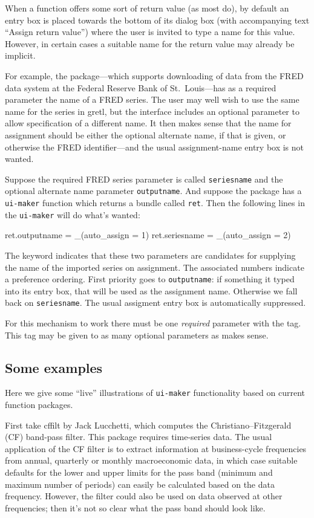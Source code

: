 \documentclass[oneside]{book}
\begin{document}
When a function offers some sort of return value (as most do), by
default an entry box is placed towards the bottom of its dialog box
(with accompanying text ``Assign return value'') where the user is
invited to type a name for this value. However, in certain cases a
suitable name for the return value may already be implicit.

For example, the  package---which supports downloading of
data from the \textsf{FRED} data system at the Federal Reserve Bank of
St.\ Louis---has as a required parameter the name of a \textsf{FRED}
series. The user may well wish to use the same name for the
series in gretl, but the interface includes an optional parameter to
allow specification of a different name. It then makes sense that the
name for assignment should be either the optional alternate name, if
that is given, or otherwise the \textsf{FRED} identifier---and the usual
assignment-name entry box is not wanted.

Suppose the required \textsf{FRED} series parameter is called
\texttt{seriesname} and the optional alternate name parameter
\texttt{outputname}. And suppose the package has a \texttt{ui-maker}
function which returns a bundle called \texttt{ret}. Then the following
lines in the \texttt{ui-maker} will do what's wanted:
\begin{code}
ret.outputname = _(auto_assign = 1)
ret.seriesname = _(auto_assign = 2)
\end{code}
The  keyword indicates that these two parameters are
candidates for supplying the name of the imported series on
assignment. The associated numbers indicate a preference ordering.
First priority goes to \texttt{outputname}: if something it typed into
its entry box, that will be used as the assignment name. Otherwise we
fall back on \texttt{seriesname}. The usual assigment entry box is
automatically suppressed.

For this mechanism to work there must be one \textit{required} parameter
with the  tag. This tag may be given to as many
optional parameters as makes sense.

\subsection{Some examples}

Here we give some ``live'' illustrations of \texttt{ui-maker}
functionality based on current function packages.

First take \textsf{cffilt} by Jack Lucchetti, which computes the
Christiano--Fitzgerald (CF) band-pass filter. This package requires
time-series data. The usual application of the CF filter is to extract
information at business-cycle frequencies from annual, quarterly or
monthly macroeconomic data, in which case suitable defaults for the
lower and upper limits for the pass band (minimum and maximum number
of periods) can easily be calculated based on the data
frequency. However, the filter could also be used on data observed at
other frequencies; then it's not so clear what the pass band should
look like.
\end{document}
